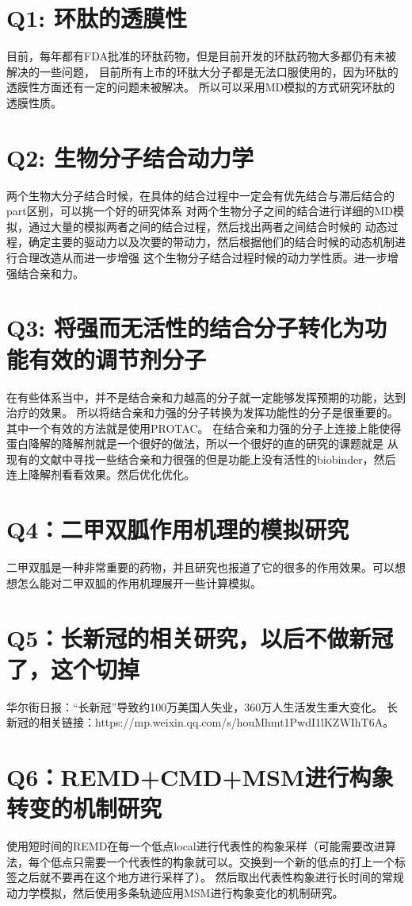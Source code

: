 \section{Q1: 环肽的透膜性}
目前，每年都有FDA批准的环肽药物，但是目前开发的环肽药物大多都仍有未被解决的一些问题，
目前所有上市的环肽大分子都是无法口服使用的，因为环肽的透膜性方面还有一定的问题未被解决。
所以可以采用MD模拟的方式研究环肽的透膜性质。
\section{Q2: 生物分子结合动力学}
两个生物大分子结合时候，在具体的结合过程中一定会有优先结合与滞后结合的part区别，可以挑一个好的研究体系
对两个生物分子之间的结合进行详细的MD模拟，通过大量的模拟两者之间的结合过程，然后找出两者之间结合时候的
动态过程，确定主要的驱动力以及次要的带动力，然后根据他们的结合时候的动态机制进行合理改造从而进一步增强
这个生物分子结合过程时候的动力学性质。进一步增强结合亲和力。
\section{Q3: 将强而无活性的结合分子转化为功能有效的调节剂分子}
在有些体系当中，并不是结合亲和力越高的分子就一定能够发挥预期的功能，达到治疗的效果。
所以将结合亲和力强的分子转换为发挥功能性的分子是很重要的。其中一个有效的方法就是使用PROTAC。
在结合亲和力强的分子上连接上能使得蛋白降解的降解剂就是一个很好的做法，所以一个很好的直的研究的课题就是
从现有的文献中寻找一些结合亲和力很强的但是功能上没有活性的biobinder，然后连上降解剂看看效果。然后优化优化。
\section{Q4：二甲双胍作用机理的模拟研究}
二甲双胍是一种非常重要的药物，并且研究也报道了它的很多的作用效果。可以想想怎么能对二甲双胍的作用机理展开一些计算模拟。
\section{Q5：长新冠的相关研究，以后不做新冠了，这个切掉}
华尔街日报：“长新冠”导致约100万美国人失业，360万人生活发生重大变化。
长新冠的相关链接：https://mp.weixin.qq.com/s/houMhmt1PwdI1lKZWIhT6A。
\section{Q6：REMD+CMD+MSM进行构象转变的机制研究}
使用短时间的REMD在每一个低点local进行代表性的构象采样（可能需要改进算法，每个低点只需要一个代表性的构象就可以。交换到一个新的低点的打上一个标签之后就不要再在这个地方进行采样了）。
然后取出代表性构象进行长时间的常规动力学模拟，然后使用多条轨迹应用MSM进行构象变化的机制研究。
